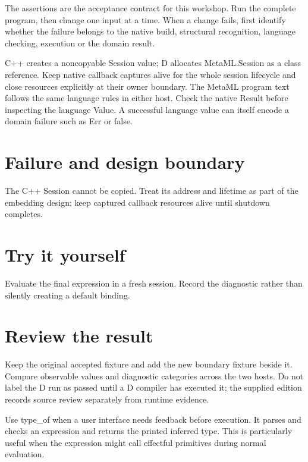The assertions are the acceptance contract for this workshop. Run the complete program, then change one input at a time. When a change fails, first identify whether the failure belongs to the native build, structural recognition, language checking, execution or the domain result.

\clearpage
{}
C++ creates a noncopyable Session value; D allocates MetaML.Session as a class reference. Keep native callback captures alive for the whole session lifecycle and close resources explicitly at their owner boundary. The MetaML program text follows the same language rules in either host. Check the native Result before inspecting the language Value. A successful language value can itself encode a domain failure such as Err or false.


\section*{Failure and design boundary}
The C++ Session cannot be copied. Treat its address and lifetime as part of the embedding design; keep captured callback resources alive until shutdown completes.

\section*{Try it yourself}
Evaluate the final expression in a fresh session. Record the diagnostic rather than silently creating a default binding.

\section*{Review the result}
Keep the original accepted fixture and add the new boundary fixture beside it. Compare observable values and diagnostic categories across the two hosts. Do not label the D run as passed until a D compiler has executed it; the supplied edition records source review separately from runtime evidence.

\clearpage
{}
Use type\_of when a user interface needs feedback before execution. It parses and checks an expression and returns the printed inferred type. This is particularly useful when the expression might call effectful primitives during normal evaluation.



